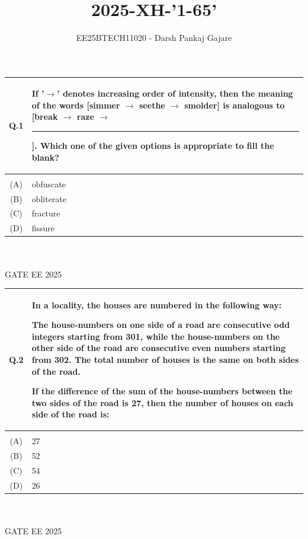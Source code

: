 \documentclass[journal,12pt,onecolumn]{IEEEtran}
\theoremstyle{remark}
\begin{document}
\title{2025-XH-'1-65'}
\author{EE25BTECH11020 - Darsh Pankaj Gajare}
\maketitle
\begin{tabular}{|c|p{16cm}|}
\hline
   Q.1 &  If '$\rightarrow $' denotes increasing order of intensity, then the meaning of the words [simmer $\rightarrow$ seethe $\rightarrow$ smolder] is analogous to [break $\rightarrow$ raze $\rightarrow$ \rule{2cm}{0.4pt} ]. Which one of the given options is appropriate to fill the blank? \\
   \hline
     & \\
    \hline
  (A) & obfuscate\\   
  \hline
  (B) & obliterate\\
  \hline
  (C) & fracture\\
  \hline
  (D) & fissure \\
  \hline
\end{tabular} 
~\\ \\
GATE EE 2025
\\

\begin{tabular}{|c|p{16cm}|}
\hline
   Q.2 & In a locality, the houses are numbered in the following way:

The house-numbers on one side of a road are consecutive odd integers starting from 301, while the house-numbers on the other side of the road are consecutive even numbers starting from 302. The total number of houses is the same on both sides of the road.

If the difference of the sum of the house-numbers between the two sides of the road is 27, then the number of houses on each side of the road is: \\
   \hline
     & \\
    \hline
  (A) & 27\\   
  \hline
  (B) & 52\\
  \hline
  (C) & 54\\
  \hline
  (D) & 26 \\
  \hline
\end{tabular} 
~\\ \\
GATE EE 2025
\\
\end{document}
